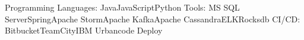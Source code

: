 \begin{cvskills}
    \cvskill
        {Programming Languages:}
        {Java{\enskip\cdotp\enskip}JavaScript{\enskip\cdotp\enskip}Python}
    \cvskill  
        {Tools:}
        {MS SQL Server{\enskip\cdotp\enskip}Spring{\enskip\cdotp\enskip}Apache Storm{\enskip\cdotp\enskip}Apache Kafka{\enskip\cdotp\enskip}Apache Cassandra{\enskip\cdotp\enskip}ELK{\enskip\cdotp\enskip}Rocksdb}
    \cvskill  
        {CI/CD:}
        {Bitbucket{\enskip\cdotp\enskip}TeamCity{\enskip\cdotp\enskip}IBM Urbancode Deploy}
\end{cvskills}
